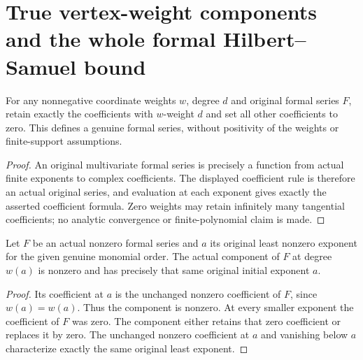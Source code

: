 \section{True vertex-weight components and the whole formal Hilbert--Samuel bound}

\begin{definition}
\label{hir:actual-weighted-component-definition}
\leanok
For any nonnegative coordinate weights $w$, degree $d$ and original
formal series $F$, retain exactly the coefficients with $w$-weight $d$
and set all other coefficients to zero. This defines a genuine formal
series, without positivity of the weights or finite-support assumptions.
\end{definition}
\begin{proof}
An original multivariate formal series is precisely a function from
actual finite exponents to complex coefficients. The displayed
coefficient rule is therefore an actual original series, and evaluation
at each exponent gives exactly the asserted coefficient formula. Zero
weights may retain infinitely many tangential coefficients; no analytic
convergence or finite-polynomial claim is made.
\end{proof}

\begin{theorem}
\label{hir:actual-weighted-component-retains-initial-exponent}
\leanok
Let $F$ be an actual nonzero formal series and $a$ its original least
nonzero exponent for the given genuine monomial order. The actual
component of $F$ at degree $w(a)$ is nonzero and has precisely that same
original initial exponent $a$.
\end{theorem}
\begin{proof}
Its coefficient at $a$ is the unchanged nonzero coefficient of $F$,
since $w(a)=w(a)$. Thus the component is nonzero. At every smaller
exponent the coefficient of $F$ was zero. The component either retains
that zero coefficient or replaces it by zero. The unchanged nonzero
coefficient at $a$ and vanishing below $a$ characterize exactly the same
original least exponent.
\end{proof}

